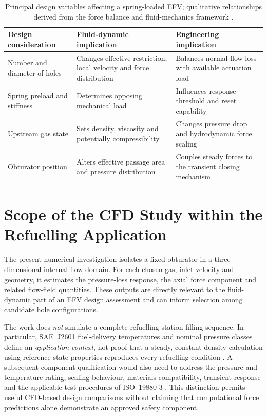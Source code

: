 \begin{table}[htbp]
\centering
\small
\begin{tabular}{@{}p{}p{}p{}@{}}
\toprule
\textbf{Design consideration} & \textbf{Fluid-dynamic implication} & \textbf{Engineering implication}\\
\midrule
Number and diameter of holes & Changes effective restriction, local velocity and force distribution & Balances normal-flow loss with available actuation load\\
Spring preload and stiffness & Determines opposing mechanical load & Influences response threshold and reset capability\\
Upstream gas state & Sets density, viscosity and potentially compressibility & Changes pressure drop and hydrodynamic force scaling\\
Obturator position & Alters effective passage area and pressure distribution & Couples steady forces to the transient closing mechanism\\
\bottomrule
\end{tabular}
\caption{Principal design variables affecting a spring-loaded EFV; qualitative relationships derived from the force balance and fluid-mechanics framework \cite{white2016,crane410}.}
\label{tab:efv_design_tradeoffs}
\end{table}

\section{Scope of the CFD Study within the Refuelling Application}
\label{sec:efv_cfd_scope}

The present numerical investigation isolates a fixed obturator in a three-dimensional internal-flow domain. For each chosen gas, inlet velocity and geometry, it estimates the pressure-loss response, the axial force component and related flow-field quantities. These outputs are directly relevant to the fluid-dynamic part of an EFV design assessment and can inform selection among candidate hole configurations.

The work does \emph{not} simulate a complete refuelling-station filling sequence. In particular, SAE~J2601 fuel-delivery temperatures and nominal pressure classes define an \emph{application context}, not proof that a steady, constant-density calculation using reference-state properties reproduces every refuelling condition \cite{sae_j2601}. A subsequent component qualification would also need to address the pressure and temperature rating, sealing behaviour, materials compatibility, transient response and the applicable test procedures of ISO~19880-3 \cite{iso19880_3}. This distinction permits useful CFD-based design comparisons without claiming that computational force predictions alone demonstrate an approved safety component.
